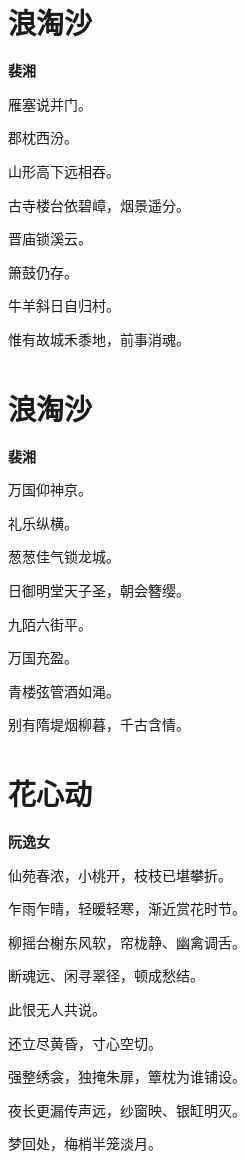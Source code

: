 \documentclass[12pt,a4paper]{ctexbook}
\begin{document}
\section{浪淘沙}
\textbf{裴湘}\par\vspace{0.5em}
雁塞说并门。\par
郡枕西汾。\par
山形高下远相吞。\par
古寺楼台依碧嶂，烟景遥分。\par
晋庙锁溪云。\par
箫鼓仍存。\par
牛羊斜日自归村。\par
惟有故城禾黍地，前事消魂。\par

\section{浪淘沙}
\textbf{裴湘}\par\vspace{0.5em}
万国仰神京。\par
礼乐纵横。\par
葱葱佳气锁龙城。\par
日御明堂天子圣，朝会簪缨。\par
九陌六街平。\par
万国充盈。\par
青楼弦管酒如渑。\par
别有隋堤烟柳暮，千古含情。\par

\section{花心动}
\textbf{阮逸女}\par\vspace{0.5em}
仙苑春浓，小桃开，枝枝已堪攀折。\par
乍雨乍晴，轻暖轻寒，渐近赏花时节。\par
柳摇台榭东风软，帘栊静、幽禽调舌。\par
断魂远、闲寻翠径，顿成愁结。\par
此恨无人共说。\par
还立尽黄昏，寸心空切。\par
强整绣衾，独掩朱扉，簟枕为谁铺设。\par
夜长更漏传声远，纱窗映、银缸明灭。\par
梦回处，梅梢半笼淡月。\par
\end{document}
